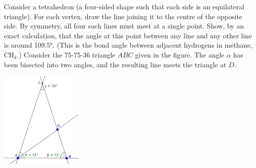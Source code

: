 \begin{questions}
  \clearpage
  \question Consider a tetrahedron (a four-sided shape such that each side is an equilateral triangle). For each
            vertex, draw the line joining it to the centre of the opposite side. By symmetry, all four such lines
            must meet at a single point. Show, by an exact calculation, that the angle at this point between any
            line and any other line is around \ang{109.5}. (This is the bond angle between adjacent hydrogens in methane, $ \mathrm{CH}_4 $.)
  \question Consider the 75-75-36 triangle $ ABC $ given in the figure. The
            angle $ \alpha $ has been bisected into two angles, and the resulting line meets
            the triangle at $ D $.
            \begin{center}
              \includegraphics[width=0.3\textwidth]{golden}
            \end{center}

\end{questions}


